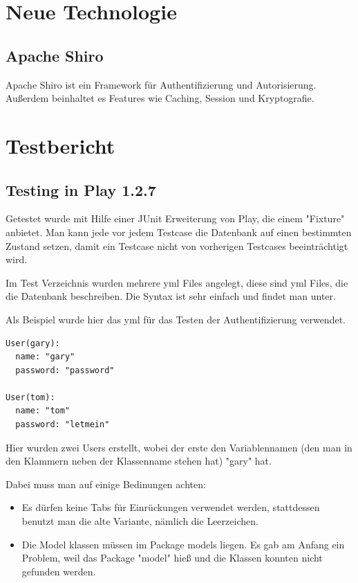 \documentclass[11pt, a4paper]{article}
\begin{document}
\section{Neue Technologie}

\subsection{Apache Shiro}

Apache Shiro ist ein Framework für Authentifizierung und Autorisierung. Außerdem beinhaltet es Features wie Caching, Session und Kryptografie. 

\section{Testbericht}
\subsection{Testing in Play 1.2.7}

Getestet wurde mit Hilfe einer JUnit Erweiterung von Play, die einem "Fixture" anbietet. Man kann jede vor jedem Testcase die Datenbank auf einen bestimmten Zustand setzen, damit ein Testcase nicht von vorherigen Testcases beeinträchtigt wird.

Im Test Verzeichnis wurden mehrere yml Files angelegt, diese sind yml Files, die die Datenbank beschreiben. Die Syntax ist sehr einfach und findet man unter. %

Als Beispiel wurde hier das yml für das Testen der Authentifizierung verwendet.

\begin{lstlisting}
User(gary):
  name: "gary"
  password: "password"

User(tom):
  name: "tom"
  password: "letmein"
\end{lstlisting}

Hier wurden zwei Users erstellt, wobei der erste den Variablennamen (den man in den Klammern neben der Klassenname stehen hat) "gary" hat. 

Dabei muss man auf einige Bedinungen achten:
\begin{itemize}
	\item Es dürfen keine Tabs für Einrückungen verwendet werden, stattdessen benutzt man die alte Variante, nämlich die Leerzeichen.
	\item Die Model klassen müssen im Package models liegen. Es gab am Anfang ein Problem, weil das Package "model" hieß und die Klassen konnten nicht gefunden werden.
\end{itemize}
\end{document}
